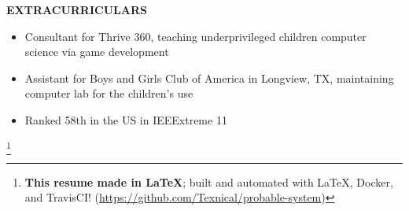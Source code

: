 \documentclass[letterpaper]{article}
\newcommand{\altsection}[1]{\noindent\textbf{#1}\smallskip}
\newcommand{\entry}[3]{\textbf{#1}, #2\begin{itemize}[leftmargin=3.5em]#3\end{itemize}\bigskip}
\newcommand\eol[1]{%
    \begingroup
    \renewcommand\thefootnote{}\footnote{#1}%
    \addtocounter{footnote}{-1}%
    \endgroup
}
\begin{document}

\altsection{EXTRACURRICULARS}

\begin{itemize}[leftmargin=3.5em]
\item Consultant for Thrive 360, teaching underprivileged children computer science via game development
\item Assistant for Boys and Girls Club of America in Longview, TX, maintaining computer lab for the children's use
\item Ranked 58th in the US in IEEExtreme 11
\end{itemize}

\eol{\noindent\textbf{This resume made in \LaTeX{}}; built and automated with \LaTeX{}, Docker, and TravisCI! (\url{https://github.com/Texnical/probable-system})}
\end{document}

